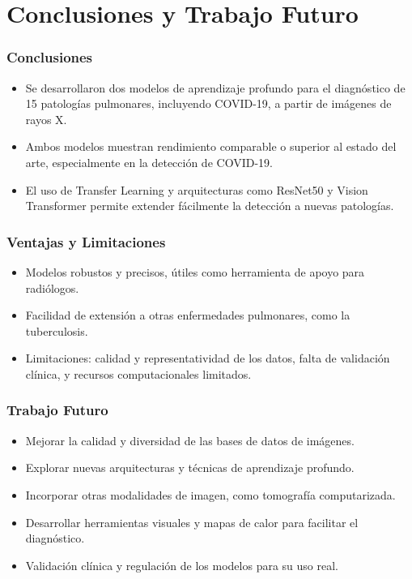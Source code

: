 
\section{Conclusiones y Trabajo Futuro}

\begin{frame}
\frametitle{Conclusiones}
\begin{itemize}
    \item Se desarrollaron dos modelos de aprendizaje profundo para el diagnóstico de 15 patologías pulmonares, incluyendo COVID-19, a partir de imágenes de rayos X.
    \item Ambos modelos muestran rendimiento comparable o superior al estado del arte, especialmente en la detección de COVID-19.
    \item El uso de Transfer Learning y arquitecturas como ResNet50 y Vision Transformer permite extender fácilmente la detección a nuevas patologías.
\end{itemize}
\end{frame}

\begin{frame}
\frametitle{Ventajas y Limitaciones}
\begin{itemize}
    \item Modelos robustos y precisos, útiles como herramienta de apoyo para radiólogos.
    \item Facilidad de extensión a otras enfermedades pulmonares, como la tuberculosis.
    \item Limitaciones: calidad y representatividad de los datos, falta de validación clínica, y recursos computacionales limitados.
\end{itemize}
\end{frame}

\begin{frame}
\frametitle{Trabajo Futuro}
\begin{itemize}
    \item Mejorar la calidad y diversidad de las bases de datos de imágenes.
    \item Explorar nuevas arquitecturas y técnicas de aprendizaje profundo.
    \item Incorporar otras modalidades de imagen, como tomografía computarizada.
    \item Desarrollar herramientas visuales y mapas de calor para facilitar el diagnóstico.
    \item Validación clínica y regulación de los modelos para su uso real.
\end{itemize}
\end{frame}
